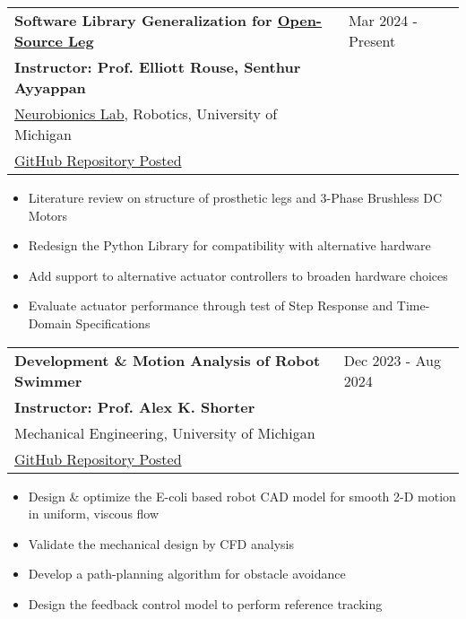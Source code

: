 \documentclass[letter,12pt]{article}
\begin{document}
\begin{tabularx}{\linewidth}{@{}l X@{}}
\large \textbf{Software Library Generalization for \href{https://www.opensourceleg.org/about}{Open-Source Leg}} & \hfill Mar 2024 - Present \\
\small{\textbf{Instructor: Prof. Elliott Rouse, Senthur Ayyappan}} & \hfill {} \\
\small{\href{https://neurobionics.robotics.umich.edu/}{Neurobionics Lab}, Robotics, University of Michigan} & \hfill {} \\
\small{\href{https://github.com/neurobionics/opensourceleg}{GitHub Repository Posted}} & \hfill {} \\
\end{tabularx}

\begin{itemize}[
    rightmargin=2cm
]
    \setlength{\itemsep}{1pt}
    \setlength{\parskip}{0pt}
    \setlength{\parsep}{0pt}
    \item{\small Literature review on structure of prosthetic legs and 3-Phase Brushless DC Motors}
    \item{\small Redesign the Python Library for compatibility with alternative hardware}
    \item{\small Add support to alternative actuator controllers to broaden hardware choices}
    \item{\small Evaluate actuator performance through test of Step Response and Time-Domain Specifications}
\end{itemize}

\begin{tabularx}{\linewidth}{@{}l X@{}}
\large \textbf{Development \& Motion Analysis of Robot Swimmer} & \hfill Dec 2023 - Aug 2024 \\
\small{\textbf{Instructor: Prof. Alex K. Shorter}} & \hfill {} \\
\small{Mechanical Engineering, University of Michigan} & \hfill {} \\
\small{\href{https://github.com/Robin0265/PathPlanning_Code}{GitHub Repository Posted}} & \hfill {} \\
\end{tabularx}

\begin{itemize}[
    rightmargin=2cm
]
    \setlength{\itemsep}{1pt}
    \setlength{\parskip}{0pt}
    \setlength{\parsep}{0pt}
    \item{\small Design \& optimize the E-coli based robot CAD model for smooth 2-D motion in uniform, viscous flow}
    \item{\small Validate the mechanical design by CFD analysis}
    \item{\small Develop a path-planning algorithm for obstacle avoidance}
    \item{\small Design the feedback control model to perform reference tracking}
    
\end{itemize}
\end{document}
